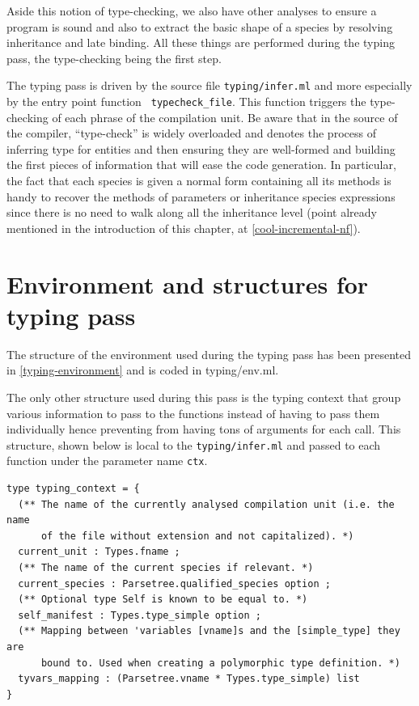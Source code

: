 \medskip
Aside this notion of type-checking, we also have other analyses to
ensure a program is sound and also to extract the basic shape of a
species by resolving inheritance and late binding. All these things
are performed during the typing pass, the type-checking being the
first step.

\medskip
The typing pass is driven by the source file {\tt typing/infer.ml} and
more especially by the entry point function {\tt
  typecheck\_file}. This function triggers the type-checking of each
phrase of the compilation unit. Be aware that in the source of the
compiler, ``type-check'' is widely overloaded and denotes the process
of inferring type for entities and then ensuring they are well-formed
and building the first pieces of information that will ease the code
generation. In particular, the fact that each species is given a
normal form containing all its methods is handy to recover the methods
of parameters or inheritance species expressions since there is no
need to walk along all the inheritance level (point already mentioned
in the introduction of this chapter, at \ref{cool-incremental-nf}).



\section{Environment and structures for typing pass}
The structure of the environment used during the typing pass has been
presented in \ref{typing-environment} and is coded in {typing/env.ml}.

The only other structure used during this pass is the typing context
that group various information to pass to the functions instead of
having to pass them individually hence preventing from having tons of
arguments for each call. This structure, shown below is local to
the {\tt typing/infer.ml} and passed to each function under the
parameter name {\tt ctx}.

{\footnotesize
\begin{lstlisting}[language=MyOCaml, title=Typing context]
type typing_context = {
  (** The name of the currently analysed compilation unit (i.e. the name
      of the file without extension and not capitalized). *)
  current_unit : Types.fname ;
  (** The name of the current species if relevant. *)
  current_species : Parsetree.qualified_species option ;
  (** Optional type Self is known to be equal to. *)
  self_manifest : Types.type_simple option ;
  (** Mapping between 'variables [vname]s and the [simple_type] they are
      bound to. Used when creating a polymorphic type definition. *)
  tyvars_mapping : (Parsetree.vname * Types.type_simple) list
}
\end{lstlisting}
}




